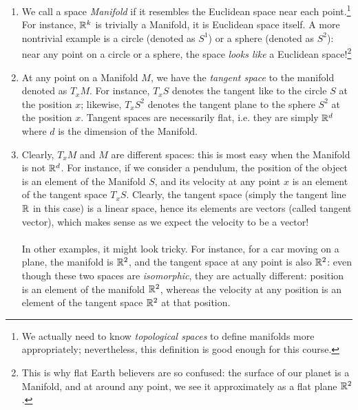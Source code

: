 {\begin{enumerate}
	\item We call a space \emph{Manifold} if it resembles the Euclidean space near each point.\footnote{We actually need to know \emph{topological spaces} to define manifolds more appropriately; nevertheless, this definition is good enough for this course.} For instance, $\mathbb{R}^k$ is trivially a Manifold, it is Euclidean space itself. A more nontrivial example is a circle (denoted as $S^1$) or a sphere (denoted as $S^2$): near any point on a circle or a sphere, the space \emph{looks like} a Euclidean space!\footnote{This is why flat Earth believers are so confused: the surface of our planet is a Manifold, and at around any point, we see it approximately as a flat plane $\mathbb{R}^2$.}
	\item At any point on a Manifold $M$, we have the \emph{tangent space} to the manifold denoted as $T_xM$. For instance, $T_xS$ denotes the tangent like to the circle $S$ at the position $x$; likewise, $T_xS^2$ denotes the tangent plane to the sphere $S^2$ at the position $x$. Tangent spaces are necessarily flat, i.e. they are simply $\mathbb{R}^d$ where $d$ is the dimension of the Manifold.
	\item Clearly, $T_xM$ and $M$ are different spaces: this is most easy when the Manifold is not $\mathbb{R}^d$. For instance, if we consider a pendulum, the position of the object is an element of the Manifold $S$, and its velocity at any point $x$ is an element of the tangent space $T_xS$. Clearly, the tangent space (simply the tangent line $\mathbb{R}$ in this case) is a linear space, hence its elements are vectors (called tangent vector), which makes sense as we expect the velocity to be a vector! 
	\\\\
	In other examples, it might look tricky. For instance, for a car moving on a plane, the manifold is $\mathbb{R}^2$, and the tangent space at any point is also $\mathbb{R}^2$: even though these two spaces are \emph{isomorphic}, they are actually different: position is an element of the manifold $\mathbb{R}^2$, whereas the velocity at any position is an element of the tangent space $\mathbb{R}^2$ at that position.
	

\end{enumerate}}
